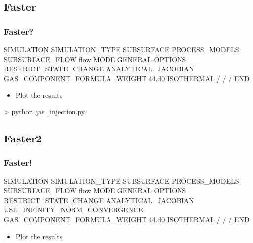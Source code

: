 \documentclass{beamer}
\begin{document}
\subsection{Faster}
\begin{frame}[fragile]\frametitle{Faster?}

\begin{semiverbatim}
SIMULATION
  SIMULATION_TYPE SUBSURFACE
  PROCESS_MODELS
    SUBSURFACE_FLOW flow
      MODE GENERAL 
      OPTIONS
        RESTRICT_STATE_CHANGE
        ANALYTICAL_JACOBIAN
        GAS_COMPONENT_FORMULA_WEIGHT 44.d0 
        ISOTHERMAL 
      /
    /
  /
END
\end{semiverbatim}

\begin{itemize}
  \item Plot the results
\end{itemize}

\begin{semiverbatim}
> python gas_injection.py
\end{semiverbatim}

\end{frame}

\subsection{Faster2}
\begin{frame}[fragile]\frametitle{Faster!}

\begin{semiverbatim}
SIMULATION
  SIMULATION_TYPE SUBSURFACE
  PROCESS_MODELS
    SUBSURFACE_FLOW flow
      MODE GENERAL 
      OPTIONS
        RESTRICT_STATE_CHANGE
        ANALYTICAL_JACOBIAN
        USE_INFINITY_NORM_CONVERGENCE
        GAS_COMPONENT_FORMULA_WEIGHT 44.d0 
        ISOTHERMAL 
      /
    /
  /
END
\end{semiverbatim}

\begin{itemize}
  \item Plot the results
\end{itemize}

\end{frame}
\end{document}

